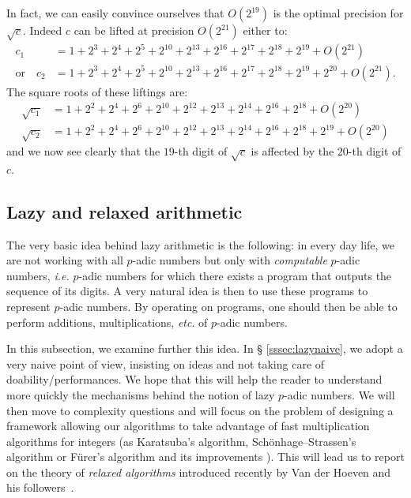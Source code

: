 \documentclass[11pt]{article}
\numberwithin{equation}{section}
\numberwithin{figure}{section}
\theoremstyle{definition}
\begin{document}
In fact, we can easily convince ourselves that $O(2^{19})$ is the 
optimal precision for $\sqrt c$. Indeed $c$ can be lifted at precision
$O(2^{21})$ either to:
\begin{align*}
c_1 & = 1 + 2^{3} + 2^{4} + 2^{5} + 2^{10} + 2^{13} + 2^{16} + 2^{17} + 
        2^{18} + 2^{19} + O(2^{21}) \\
\text{or} \quad 
c_2 & = 1 + 2^{3} + 2^{4} + 2^{5} + 2^{10} + 2^{13} + 2^{16} + 2^{17} + 
        2^{18} + 2^{19} + 2^{20} + O(2^{21}).
\end{align*}
The square roots of these liftings are:
\begin{align*}
\sqrt{c_1} & = 1 + 2^2 + 2^4 + 2^6 + 2^{10} + 2^{12} + 2^{13} + 2^{14} + 
               2^{16} + 2^{18} + O(2^{20}) \\
\sqrt{c_2} & = 1 + 2^2 + 2^4 + 2^6 + 2^{10} + 2^{12} + 2^{13} + 2^{14} + 
               2^{16} + 2^{18} + 2^{19} + O(2^{20})
\end{align*}
and we now see clearly that the $19$-th digit of $\sqrt c$ is
affected by the $20$-th digit of $c$.

\subsection{Lazy and relaxed arithmetic}
\label{ssec:lazy}

The very basic idea behind lazy arithmetic is the following: in every 
day life, we are not working with all $p$-adic numbers but only with 
\emph{computable} $p$-adic numbers, \emph{i.e.} $p$-adic numbers for
which there exists a program that outputs the sequence of its digits.
A very natural idea is then to use these programs to represent $p$-adic
numbers. By operating on programs, one should then be able to perform
additions, multiplications, \emph{etc}. of $p$-adic numbers.

In this subsection, we examine further this idea. In \S 
\ref{sssec:lazynaive}, we adopt a very naive point of view, insisting on 
ideas and not taking care of doability/performances. We hope that this 
will help the reader to understand more quickly the mechanisms behind the 
notion of lazy $p$-adic numbers. We will then move to complexity 
questions and will focus on the problem of designing a framework 
allowing our algorithms to take advantage of fast multiplication 
algorithms for integers (as 
Karatsuba's algorithm, Schönhage--Strassen's algorithm 
\cite[\S 8]{GaGe03} or Fürer's algorithm and its improvements 
\cite{Fu09,HaHoLe15}). This will lead us to report on the theory of 
\emph{relaxed algorithms} introduced recently by Van der Hoeven and his
followers~\cite{Ho97,Ho02,Ho07,BeHoLe11,BeLe12,Le13}.
\end{document}
